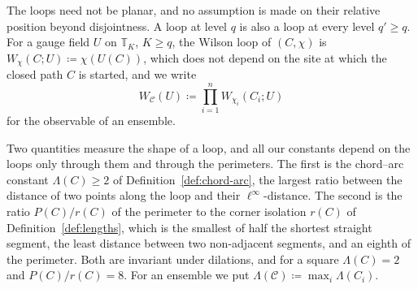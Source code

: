\documentclass[11pt]{preprint}
\numberwithin{equation}{section}
\theoremstyle{definition}
\theoremstyle{remark}
\theoremstyle{plain}
\begin{document}
The loops need not be planar, and no assumption is made on their relative position beyond disjointness. A loop at level $q$ is also a loop at every level $q' \geq q$. For a gauge field $U$ on $\mathbb T_K$, $K \geq q$, the Wilson loop of $(C, \chi)$ is $W_\chi(C; U) \coloneqq \chi(U(C))$, which does not depend on the site at which the closed path $C$ is started, and we write
\begin{equation}\label{eq:ensemble-observable}
    W_{\mathcal C}(U) \coloneqq \prod_{i=1}^{n}W_{\chi_i}(C_i; U)
\end{equation}
for the observable of an ensemble.

Two quantities measure the shape of a loop, and all our constants depend on the loops only through them and through the perimeters. The first is the chord--arc constant $\Lambda(C) \geq 2$ of Definition~\ref{def:chord-arc}, the largest ratio between the distance of two points along the loop and their $\ell^\infty$-distance. The second is the ratio $P(C)/r(C)$ of the perimeter to the corner isolation $r(C)$ of Definition~\ref{def:lengths}, which is the smallest of half the shortest straight segment, the least distance between two non-adjacent segments, and an eighth of the perimeter. Both are invariant under dilations, and for a square $\Lambda(C) = 2$ and $P(C)/r(C) = 8$. For an ensemble we put $\Lambda(\mathcal C) \coloneqq \max_i\Lambda(C_i)$.
\end{document}
